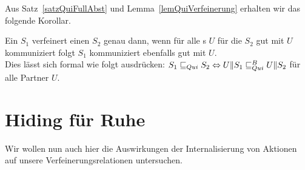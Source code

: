 Aus Satz~\ref{satzQuiFullAbst} und Lemma~\ref{lemQuiVerfeinerung} erhalten wir
das folgende Korollar.

\begin{kor}
  Ein \EIO{} $S_1$ verfeinert einen \EIO{} $S_2$ genau dann, wenn für alle
  \EIO{}s $U$ für die $S_2$ gut mit $U$ kommuniziert folgt $S_1$ kommuniziert
  ebenfalls gut mit $U$.\\
  Dies lässt sich formal wie folgt ausdrücken: $S_1\sqsubseteq _{Qui} S_2\Leftrightarrow
  U\|S_1\sqsubseteq _{Qui}^B U\|S_2$ für alle Partner $U$.
\end{kor}

\section{Hiding für Ruhe}

Wir wollen nun auch hier die Auswirkungen der Internalisierung von Aktionen auf
unsere Verfeinerungsrelationen untersuchen.\\
